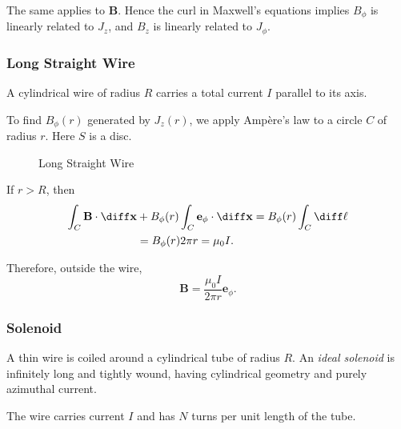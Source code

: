 \documentclass[12pt]{article}
\begin{document}
The same applies to $\mathbf{B}$. Hence the curl in Maxwell's equations implies $B_{\phi}$ is linearly related to $J_z$, and $B_z$ is linearly related to $J_{\phi}$.

\subsubsection{Long Straight Wire}
\label{subsub:long_straight_wire}

A cylindrical wire of radius $R$ carries a total current $I$ parallel to its axis.

To find $B_{\phi}(r)$ generated by $J_z(r)$, we apply Amp\`{e}re's law to a circle $C$ of radius $r$. Here $S$ is a disc.

\begin{figure}[h]
	\centering
	\caption{Long Straight Wire}
	\label{fig:long_straight_wire}
\end{figure}

If $r > R$, then
\begin{align*}
	\int_{C} \mathbf{B} \cdot \diff \mathbf{x} &+ B_{\phi}(r) \int_{C} \mathbf{e}_{\phi} \cdot \diff \mathbf{x} = B_{\phi}(r) \int_{C} \diff \ell \\
						   &= B_{\phi}(r) 2 \pi r = \mu_0 I.
\end{align*}

Therefore, outside the wire,
\[
\mathbf{B} = \frac{\mu_0 I}{2 \pi r} \mathbf{e}_{\phi}
.\]

\subsubsection{Solenoid}
\label{subsub:solenoid}

A thin wire is coiled around a cylindrical tube of radius $R$. An \emph{ideal solenoid} is infinitely long and tightly wound, having cylindrical geometry and purely azimuthal current.

The wire carries current $I$ and has $N$ turns per unit length of the tube.
\end{document}
